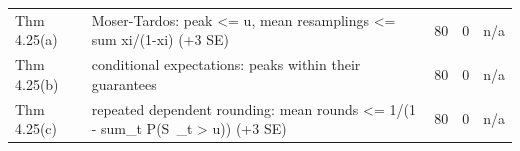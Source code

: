 \begin{table}[htbp]
\begin{tabular}{llrrl}
Thm 4.25(a) & Moser-Tardos: peak <= u, mean resamplings <= sum xi/(1-xi) (+3 SE) & 80 & 0 & n/a \\
Thm 4.25(b) & conditional expectations: peaks within their guarantees & 80 & 0 & n/a \\
Thm 4.25(c) & repeated dependent rounding: mean rounds <= 1/(1 - sum\_t P(S~\_t > u)) (+3 SE) & 80 & 0 & n/a \\
\bottomrule
\end{tabular}
\end{table}
